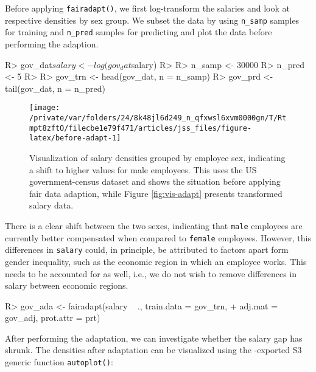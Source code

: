 \documentclass[
  nojss]{jss}
\begin{document}
Before applying \texttt{fairadapt()}, we first log-transform the
salaries and look at respective densities by sex group. We subset the
data by using \texttt{n\_samp} samples for training and \texttt{n\_pred}
samples for predicting and plot the data before performing the adaption.

\begin{CodeChunk}
\begin{CodeInput}
R> gov_dat$salary <- log(gov_dat$salary)
R> 
R> n_samp <- 30000
R> n_pred <- 5
R> 
R> gov_trn <- head(gov_dat, n = n_samp)
R> gov_prd <- tail(gov_dat, n = n_pred)
\end{CodeInput}
\end{CodeChunk}

\begin{CodeChunk}
\begin{figure}

{\centering \texttt{[image: /private/var/folders/24/8k48jl6d249\_n\_qfxwsl6xvm0000gn/T/Rtmpt8zftO/filecbe1e79f471/articles/jss\_files/figure-latex/before-adapt-1]} 

}

\caption{Visualization of salary densities grouped by employee sex, indicating a shift to higher values for male employees. This uses the US government-census dataset and shows the situation before applying fair data adaption, while Figure \ref{fig:vis-adapt} presents transformed salary data.}\label{fig:before-adapt}
\end{figure}
\end{CodeChunk}

There is a clear shift between the two sexes, indicating that
\texttt{male} employees are currently better compensated when compared
to \texttt{female} employees. However, this differences in
\texttt{salary} could, in principle, be attributed to factors apart form
gender inequality, such as the economic region in which an employee
works. This needs to be accounted for as well, i.e., we do not wish to
remove differences in salary between economic regions.

\begin{CodeChunk}
\begin{CodeInput}
R> gov_ada <- fairadapt(salary ~ ., train.data = gov_trn,
+                      adj.mat = gov_adj, prot.attr = prt)
\end{CodeInput}
\end{CodeChunk}

After performing the adaptation, we can investigate whether the salary
gap has shrunk. The densities after adaptation can be visualized using
the -exported S3 generic function \texttt{autoplot()}:
\end{document}

